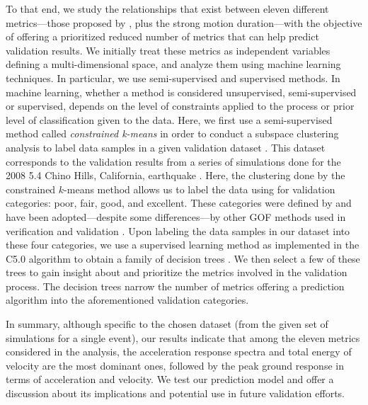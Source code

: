 To that end, we study the relationships that exist between eleven different metrics---those proposed by \citet{Anderson_2004_Proc}, plus the strong motion duration---with the objective of offering a prioritized reduced number of metrics that can help predict validation results. We initially treat these metrics as independent variables defining a multi-dimensional space, and analyze them using machine learning techniques. In particular, we use semi-supervised and supervised methods. In machine learning, whether a method is considered unsupervised, semi-supervised or supervised, depends on the level of constraints applied to the process or prior level of classification given to the data. Here, we first use a semi-supervised method called \textit{constrained k-means} in order to conduct a subspace clustering analysis to label data samples in a given validation dataset \citep[e.g.,][]{Macqueen_1967_Proc, Wagstaff_2001_Proc}. This dataset corresponds to the validation results from a series of simulations done for the 2008  5.4 Chino Hills, California, earthquake \citep{Taborda_2014_BSSA}. Here, the clustering done by the constrained $k$-means method allows us to label the data using for validation categories: poor, fair, good, and excellent. These categories were defined by \citet{Anderson_2004_Proc} and have been adopted---despite some differences---by other GOF methods used in verification and validation \citep[e.g.,][]{Kristekova_2009_GJI, Olsen_2010_SRL}. Upon labeling the data samples in our dataset into these four categories, we use a supervised learning method as implemented in the C5.0 algorithm to obtain a family of decision trees \citep[][]{Quinlan_1993_Book, Quinlan_1996_JAIR}. We then select a few of these trees to gain insight about and prioritize the metrics involved in the validation process. The decision trees narrow the number of metrics offering a prediction algorithm into the aforementioned validation categories.

In summary, although specific to the chosen dataset (from the given set of simulations for a single event), our results indicate that among the eleven metrics considered in the analysis, the acceleration response spectra and total energy of velocity are the most dominant ones, followed by the peak ground response in terms of acceleration and velocity. We test our prediction model and offer a discussion about its implications and potential use in future validation efforts.
